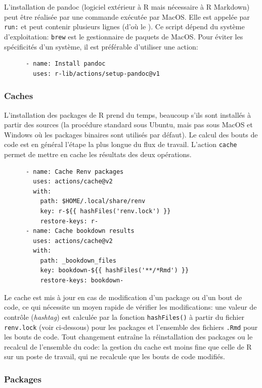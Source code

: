 \documentclass[
  12pt,
  french,
  a4paper,
  extrafontsizes,onecolumn,openright
  ]{memoir}
\begin{document}
L'installation de pandoc (logiciel extérieur à R mais nécessaire à R Markdown) peut être réalisée par une commande exécutée par MacOS.
Elle est appelée par \texttt{run:} et peut contenir plusieurs lignes (d'où le \texttt{\textbar{}}).
Ce script dépend du système d'exploitation: \texttt{brew} est le gestionnaire de paquets de MacOS.
Pour éviter les spécificités d'un système, il est préférable d'utiliser une action:

\begin{verbatim}
      - name: Install pandoc
        uses: r-lib/actions/setup-pandoc@v1
\end{verbatim}

\hypertarget{caches}{%
\subsubsection{Caches}\label{caches}}

L'installation des packages de R prend du temps, beaucoup s'ils sont installés à partir des sources (la procédure standard sous Ubuntu, mais pas sous MacOS et Windows où les packages binaires sont utilisés par défaut).
Le calcul des bouts de code est en général l'étape la plus longue du flux de travail.
L'action \texttt{cache} permet de mettre en cache les résultats des deux opérations.

\begin{verbatim}
      - name: Cache Renv packages
        uses: actions/cache@v2
        with:
          path: $HOME/.local/share/renv
          key: r-${{ hashFiles('renv.lock') }}
          restore-keys: r-
      - name: Cache bookdown results
        uses: actions/cache@v2
        with:
          path: _bookdown_files
          key: bookdown-${{ hashFiles('**/*Rmd') }}
          restore-keys: bookdown-
\end{verbatim}

Le cache est mis à jour en cas de modification d'un package ou d'un bout de code, ce qui nécessite un moyen rapide de vérifier les modifications: une valeur de contrôle (\emph{hashtag}) est calculée par la fonction \texttt{hashFiles()} à partir du fichier \texttt{renv.lock} (voir ci-dessous) pour les packages et l'ensemble des fichiers \texttt{.Rmd} pour les bouts de code.
Tout changement entraîne la réinstallation des packages ou le recalcul de l'ensemble du code: la gestion du cache est moins fine que celle de R sur un poste de travail, qui ne recalcule que les bouts de code modifiés.

\hypertarget{sec:packages-ci}{%
\subsubsection{Packages}\label{sec:packages-ci}}
\end{document}

